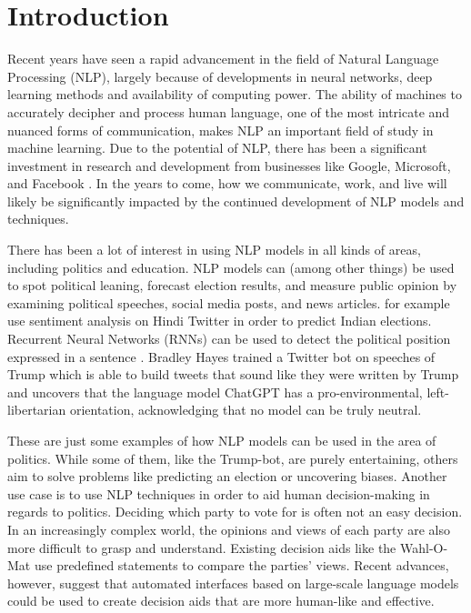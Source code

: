 \chapter{Introduction}\label{intro}

Recent years have seen a rapid advancement in the field of Natural Language Processing (NLP), largely because of developments in neural networks, deep learning methods and availability of computing power. The ability of machines to accurately decipher and process human language, one of the most intricate and nuanced forms of communication, makes NLP an important field of study in machine learning. Due to the potential of NLP, there has been a significant investment in research and development from businesses like Google, Microsoft, and Facebook \citep{invest}. In the years to come, how we communicate, work, and live will likely be significantly impacted by the continued development of NLP models and techniques.

There has been a lot of interest in using NLP models in all kinds of areas, including politics and education. NLP models can (among other things) be used to spot political leaning, forecast election results, and measure public opinion by examining political speeches, social media posts, and news articles. \citet{sharma2016prediction} for example use sentiment analysis on Hindi Twitter in order to predict Indian elections. Recurrent Neural Networks (RNNs) can be used to detect the political position expressed in a sentence \citep{iyyer2014political}. Bradley Hayes trained a Twitter bot on speeches of Trump which is able to build tweets that sound like they were written by Trump \citep{trump_bot} and \citet{hartmann2023political} uncovers that the language model ChatGPT \citep{chatgpt} has a pro-environmental, left-libertarian orientation, acknowledging that no model can be truly neutral.

These are just some examples of how NLP models can be used in the area of politics. While some of them, like the Trump-bot, are purely entertaining, others aim to solve problems like predicting an election or uncovering biases. Another use case is to use NLP techniques in order to aid human decision-making in regards to politics. Deciding which party to vote for is often not an easy decision. In an increasingly complex world, the opinions and views of each party are also more difficult to grasp and understand. Existing decision aids like the Wahl-O-Mat \citep{wahlomat} use predefined statements to compare the parties' views. Recent advances, however, suggest that automated interfaces based on large-scale language models could be used to create decision aids that are more human-like and effective.

